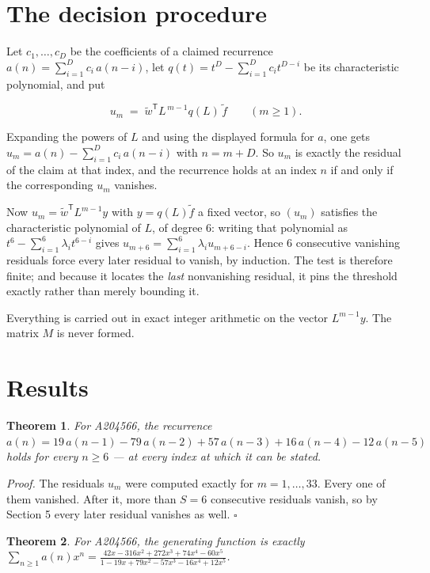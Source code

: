 \documentclass[11pt]{article}
\newtheorem{theorem}{Theorem}
\theoremstyle{definition}
\begin{document}
\section{The decision procedure}

Let $c_1,\dots,c_D$ be the coefficients of a claimed recurrence $a(n) = \sum_{i=1}^{D} c_i\,a(n-i)$, let $q(t) = t^{D} - \sum_{i=1}^{D} c_i t^{D-i}$ be its characteristic polynomial, and put

\[u_m \;=\; \tilde w^{\mathsf T} L^{\,m-1} q(L)\,\tilde f \qquad (m \ge 1).\]

Expanding the powers of $L$ and using the displayed formula for $a$, one gets $u_m = a(n) - \sum_{i=1}^{D} c_i\,a(n-i)$ with $n = m + D$. So $u_m$ is exactly the residual of the claim at that index, and the recurrence holds at an index $n$ if and only if the corresponding $u_m$ vanishes.

Now $u_m = \tilde w^{\mathsf T} L^{m-1} y$ with $y = q(L)\tilde f$ a fixed vector, so $(u_m)$ satisfies the characteristic polynomial of $L$, of degree $6$: writing that polynomial as $t^{6} - \sum_{i=1}^{6} \lambda_i t^{6-i}$ gives $u_{m+6} = \sum_{i=1}^{6} \lambda_i u_{m+6-i}$. Hence $6$ consecutive vanishing residuals force every later residual to vanish, by induction. The test is therefore finite; and because it locates the {\itshape last} nonvanishing residual, it pins the threshold exactly rather than merely bounding it.

Everything is carried out in exact integer arithmetic on the vector $L^{m-1}y$. The matrix $M$ is never formed.

\section{Results}

\begin{theorem} For A204566, the recurrence $a(n) = 19\,a(n-1) - 79\,a(n-2) + 57\,a(n-3) + 16\,a(n-4) - 12\,a(n-5)$ holds for every $n \ge 6$ --- at every index at which it can be stated.\end{theorem}

{\itshape Proof.} The residuals $u_m$ were computed exactly for $m = 1,\dots,33$. Every one of them vanished. After it, more than $S = 6$ consecutive residuals vanish, so by Section 5 every later residual vanishes as well. $\square$

\begin{theorem} For A204566, the generating function is exactly $\sum_{n\ge 1} a(n)x^n = \frac{42x - 316x^{2} + 272x^{3} + 74x^{4} - 60x^{5}}{1 - 19x + 79x^{2} - 57x^{3} - 16x^{4} + 12x^{5}}$.\end{theorem}
\end{document}
